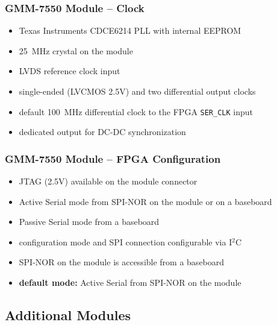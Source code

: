 \begin{frame}
  \frametitle{GMM-7550 Module -- Clock}
  \begin{itemize}
  \item Texas Instruments CDCE6214 PLL with internal EEPROM
  \item 25~MHz crystal on the module
  \item LVDS reference clock input
  \item single-ended (LVCMOS 2.5V) and two differential output clocks
  \item default 100~MHz differential clock to the FPGA \texttt{SER\_CLK} input
  \item dedicated output for DC-DC synchronization
  \end{itemize}
\end{frame}

\begin{frame}
  \frametitle{GMM-7550 Module -- FPGA Configuration}
  \begin{itemize}
  \item JTAG (2.5V) available on the module connector
  \item Active Serial mode from SPI-NOR on the module or on a
  baseboard
  \item Passive Serial mode from a baseboard
  \item configuration mode and SPI connection configurable via I$^2$C
  \item SPI-NOR on the module is accessible from a baseboard
  \item \textbf{default mode:} Active Serial from SPI-NOR on the module
  \end{itemize}
\end{frame}

\subsection{Additional Modules}

